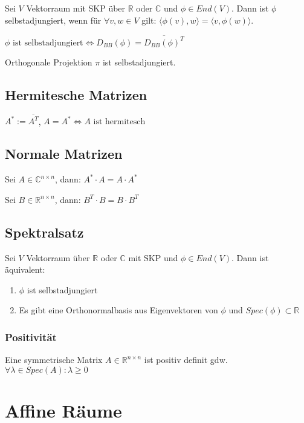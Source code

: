 Sei $V$ Vektorraum mit SKP über $\mathbb{R}$ oder $\mathbb{C}$ und $\phi \in End(V)$. Dann ist $\phi$ selbstadjungiert, wenn für $\forall v, w \in V$ gilt: $\langle \phi(v), w \rangle = \langle v, \phi(w) \rangle$.

$\phi \text{ ist selbstadjungiert} \Leftrightarrow D_{BB}(\phi)=\overline{D_{BB}(\phi)^T}$

Orthogonale Projektion $\pi$ ist selbstadjungiert.

\subsection*{Hermitesche Matrizen}

$A^* := \overline{A^T}$, $A = A^* \Leftrightarrow A \text{ ist hermitesch}$

\subsection*{Normale Matrizen}

Sei $A \in \mathbb{C}^{n\times n}$, dann: $A^* \cdot A = A \cdot A^*$

Sei $B \in \mathbb{R}^{n\times n}$, dann: $B^T \cdot B = B \cdot B^T$

\subsection*{Spektralsatz}

Sei $V$ Vektorraum über $\mathbb{R}$ oder $\mathbb{C}$ mit SKP und $\phi \in End(V)$. Dann ist äquivalent:

\begin{enumerate}[label=(\alph*)]
	\item $\phi$ ist selbstadjungiert
	\item Es gibt eine Orthonormalbasis aus Eigenvektoren von $\phi$ und $Spec(\phi) \subset \mathbb{R}$
\end{enumerate}

\subsubsection*{Positivität}

Eine symmetrische Matrix $A \in \mathbb{R}^{n \times n}$ ist positiv definit gdw. $\forall \lambda \in Spec(A) : \lambda \geq 0$

\section*{Affine Räume}

